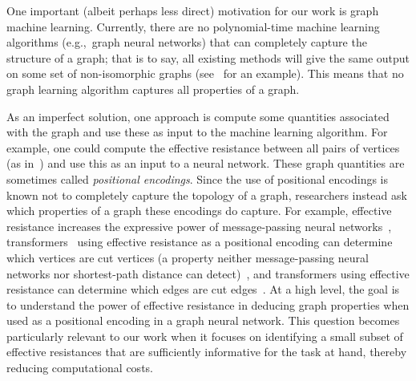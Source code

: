 One important (albeit perhaps less direct) motivation for our work is graph machine learning. Currently, there are no polynomial-time machine learning algorithms (e.g.,~graph neural networks) that can completely capture the structure of a graph; that is to say, all existing methods will give the same output on some set of non-isomorphic graphs (see~\citep{xu2018how} for an example). This means that no graph learning algorithm captures all properties of a graph.
\par 
As an imperfect solution, one approach is compute some quantities associated with the graph and use these as input to the machine learning algorithm. For example, one could compute the effective resistance between all pairs of vertices (as in~\citep{zhang2023rethinking,velingker2024affinity}) and use this as an input to a neural network. These graph quantities are sometimes called \textit{positional encodings}. Since the use of positional encodings is known not to completely capture the topology of a graph, researchers instead ask which properties of a graph these encodings do capture. For example, effective resistance increases the expressive power of message-passing neural networks~\citep{velingker2024affinity}, transformers~\citep{vaswani2017attention} using effective resistance as a positional encoding can determine which vertices are cut vertices (a property neither message-passing neural networks nor shortest-path distance can detect)~\citep{zhang2023rethinking}, and transformers using effective resistance can determine which edges are cut edges~\citep{black2024comparing}. At a high level, the goal is to understand the power of effective resistance in deducing graph properties when used as a positional encoding in a graph neural network. This question becomes particularly relevant to our work when it focuses on identifying a small subset of effective resistances that are sufficiently informative for the task at hand, thereby reducing computational costs.